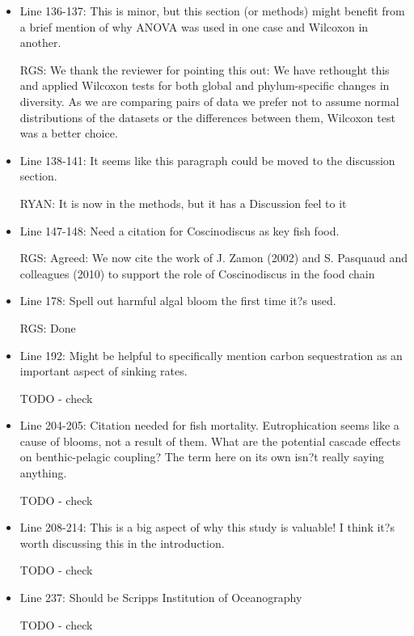 \documentclass[11pt]{article}
\begin{document}
\begin{linenumbers}
\begin{itemize}
\item{Line 136-137: This is minor, but this section (or methods) might benefit from a brief mention of why ANOVA was used in one case and Wilcoxon in another.}

{\color{red} RGS: We thank the reviewer for pointing this out: We have rethought this and applied Wilcoxon tests for both global and phylum-specific changes in diversity. As we are comparing pairs of data we prefer not to assume normal distributions of the datasets or the differences between them, Wilcoxon test was a better choice. }


\item{Line 138-141: It seems like this paragraph could be moved to the discussion section.}

{\color{red} RYAN: It is now in the methods, but it has a Discussion feel to it }


\item{Line 147-148: Need a citation for Coscinodiscus as key fish food.}

{\color{red} RGS: Agreed: We now cite the work of J. Zamon (2002) and S. Pasquaud and colleagues (2010) to support the role of Coscinodiscus in the food chain }


\item{Line 178: Spell out harmful algal bloom the first time it?s used.}

{\color{red} RGS: Done }


\item{Line 192: Might be helpful to specifically mention carbon sequestration as an important aspect of sinking rates.}

{\color{red} TODO - check }


\item{Line 204-205: Citation needed for fish mortality. Eutrophication seems like a cause of blooms, not a result of them. What are the potential cascade effects on benthic-pelagic coupling? The term here on its own isn?t really saying anything.}

{\color{red} TODO - check }


\item{Line 208-214: This is a big aspect of why this study is valuable! I think it?s worth discussing this in the introduction.}

{\color{red} TODO - check }


\item{Line 237: Should be Scripps Institution of Oceanography}

{\color{red} TODO - check }



\end{itemize}
\end{linenumbers}
\end{document}
